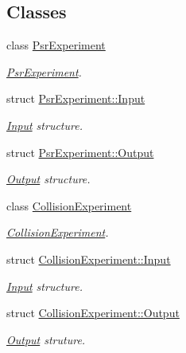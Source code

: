 \subsection*{Classes}
\begin{DoxyCompactItemize}
\item 
class \hyperlink{classPsrExperiment}{Psr\+Experiment}
\begin{DoxyCompactList}\small\item\em \hyperlink{classPsrExperiment}{Psr\+Experiment}. \end{DoxyCompactList}\item 
struct \hyperlink{structPsrExperiment_1_1Input}{Psr\+Experiment\+::\+Input}
\begin{DoxyCompactList}\small\item\em \hyperlink{structPsrExperiment_1_1Input}{Input} structure. \end{DoxyCompactList}\item 
struct \hyperlink{structPsrExperiment_1_1Output}{Psr\+Experiment\+::\+Output}
\begin{DoxyCompactList}\small\item\em \hyperlink{structPsrExperiment_1_1Output}{Output} structure. \end{DoxyCompactList}\item 
class \hyperlink{classCollisionExperiment}{Collision\+Experiment}
\begin{DoxyCompactList}\small\item\em \hyperlink{classCollisionExperiment}{Collision\+Experiment}. \end{DoxyCompactList}\item 
struct \hyperlink{structCollisionExperiment_1_1Input}{Collision\+Experiment\+::\+Input}
\begin{DoxyCompactList}\small\item\em \hyperlink{structCollisionExperiment_1_1Input}{Input} structure. \end{DoxyCompactList}\item 
struct \hyperlink{structCollisionExperiment_1_1Output}{Collision\+Experiment\+::\+Output}
\begin{DoxyCompactList}\small\item\em \hyperlink{structCollisionExperiment_1_1Output}{Output} struture. \end{DoxyCompactList}\end{DoxyCompactItemize}
